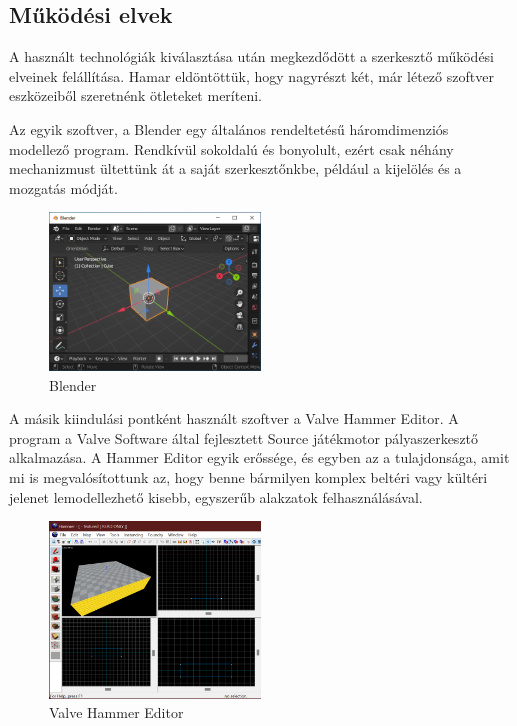 \subsection{Működési elvek}

A használt technológiák kiválasztása után megkezdődött a szerkesztő működési elveinek felállítása.
Hamar eldöntöttük, hogy nagyrészt két, már létező szoftver eszközeiből szeretnénk ötleteket
meríteni.

Az egyik szoftver, a Blender egy általános rendeltetésű
háromdimenziós modellező program. Rendkívül sokoldalú és bonyolult, ezért csak néhány mechanizmust
ültettünk át a saját szerkesztőnkbe, például a kijelölés és a mozgatás módját.

\begin{figure}[h]
      \centering
      \includegraphics[width=0.5\textwidth]{parts/developer-documentation/editor/images/blender.png}
      \caption{Blender}
\end{figure}

A másik kiindulási pontként használt szoftver a Valve Hammer Editor. A
program a Valve Software által fejlesztett Source játékmotor pályaszerkesztő alkalmazása. A Hammer
Editor egyik erőssége, és egyben az a tulajdonsága, amit mi is megvalósítottunk az, hogy benne
bármilyen komplex beltéri vagy kültéri jelenet lemodellezhető kisebb, egyszerűb alakzatok
felhasználásával.

\begin{figure}[h]
      \centering
      \includegraphics[width=0.5\textwidth]{parts/developer-documentation/editor/images/hammer.png}
      \caption{Valve Hammer Editor}
\end{figure}


